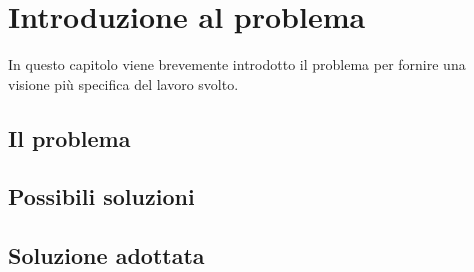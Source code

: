 \chapter{Introduzione al problema}\label{ch:introduzione}

In questo capitolo viene brevemente introdotto il problema per fornire una visione più specifica del lavoro svolto.

\section{Il problema}\label{sec:problem}
\section{Possibili soluzioni}\label{sec:solutions}
\section{Soluzione adottata}\label{sec:solution}
